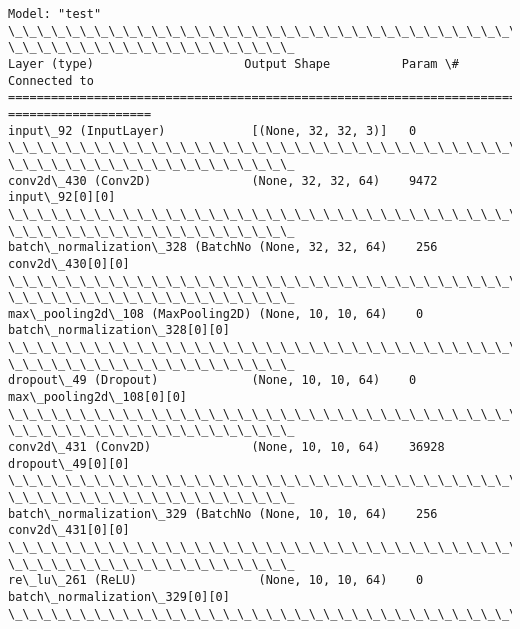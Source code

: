 \documentclass[11pt]{article}
\begin{document}
    \begin{Verbatim}[commandchars=\\\{\}]
Model: "test"
\_\_\_\_\_\_\_\_\_\_\_\_\_\_\_\_\_\_\_\_\_\_\_\_\_\_\_\_\_\_\_\_\_\_\_\_\_\_\_\_\_\_\_\_\_\_\_\_\_\_\_\_\_\_\_\_\_\_\_\_\_\_\_\_\_\_\_\_\_\_\_\_\_\_\_\_\_\_\_\_
\_\_\_\_\_\_\_\_\_\_\_\_\_\_\_\_\_\_\_\_
Layer (type)                     Output Shape          Param \#     Connected to
================================================================================
====================
input\_92 (InputLayer)            [(None, 32, 32, 3)]   0
\_\_\_\_\_\_\_\_\_\_\_\_\_\_\_\_\_\_\_\_\_\_\_\_\_\_\_\_\_\_\_\_\_\_\_\_\_\_\_\_\_\_\_\_\_\_\_\_\_\_\_\_\_\_\_\_\_\_\_\_\_\_\_\_\_\_\_\_\_\_\_\_\_\_\_\_\_\_\_\_
\_\_\_\_\_\_\_\_\_\_\_\_\_\_\_\_\_\_\_\_
conv2d\_430 (Conv2D)              (None, 32, 32, 64)    9472
input\_92[0][0]
\_\_\_\_\_\_\_\_\_\_\_\_\_\_\_\_\_\_\_\_\_\_\_\_\_\_\_\_\_\_\_\_\_\_\_\_\_\_\_\_\_\_\_\_\_\_\_\_\_\_\_\_\_\_\_\_\_\_\_\_\_\_\_\_\_\_\_\_\_\_\_\_\_\_\_\_\_\_\_\_
\_\_\_\_\_\_\_\_\_\_\_\_\_\_\_\_\_\_\_\_
batch\_normalization\_328 (BatchNo (None, 32, 32, 64)    256
conv2d\_430[0][0]
\_\_\_\_\_\_\_\_\_\_\_\_\_\_\_\_\_\_\_\_\_\_\_\_\_\_\_\_\_\_\_\_\_\_\_\_\_\_\_\_\_\_\_\_\_\_\_\_\_\_\_\_\_\_\_\_\_\_\_\_\_\_\_\_\_\_\_\_\_\_\_\_\_\_\_\_\_\_\_\_
\_\_\_\_\_\_\_\_\_\_\_\_\_\_\_\_\_\_\_\_
max\_pooling2d\_108 (MaxPooling2D) (None, 10, 10, 64)    0
batch\_normalization\_328[0][0]
\_\_\_\_\_\_\_\_\_\_\_\_\_\_\_\_\_\_\_\_\_\_\_\_\_\_\_\_\_\_\_\_\_\_\_\_\_\_\_\_\_\_\_\_\_\_\_\_\_\_\_\_\_\_\_\_\_\_\_\_\_\_\_\_\_\_\_\_\_\_\_\_\_\_\_\_\_\_\_\_
\_\_\_\_\_\_\_\_\_\_\_\_\_\_\_\_\_\_\_\_
dropout\_49 (Dropout)             (None, 10, 10, 64)    0
max\_pooling2d\_108[0][0]
\_\_\_\_\_\_\_\_\_\_\_\_\_\_\_\_\_\_\_\_\_\_\_\_\_\_\_\_\_\_\_\_\_\_\_\_\_\_\_\_\_\_\_\_\_\_\_\_\_\_\_\_\_\_\_\_\_\_\_\_\_\_\_\_\_\_\_\_\_\_\_\_\_\_\_\_\_\_\_\_
\_\_\_\_\_\_\_\_\_\_\_\_\_\_\_\_\_\_\_\_
conv2d\_431 (Conv2D)              (None, 10, 10, 64)    36928
dropout\_49[0][0]
\_\_\_\_\_\_\_\_\_\_\_\_\_\_\_\_\_\_\_\_\_\_\_\_\_\_\_\_\_\_\_\_\_\_\_\_\_\_\_\_\_\_\_\_\_\_\_\_\_\_\_\_\_\_\_\_\_\_\_\_\_\_\_\_\_\_\_\_\_\_\_\_\_\_\_\_\_\_\_\_
\_\_\_\_\_\_\_\_\_\_\_\_\_\_\_\_\_\_\_\_
batch\_normalization\_329 (BatchNo (None, 10, 10, 64)    256
conv2d\_431[0][0]
\_\_\_\_\_\_\_\_\_\_\_\_\_\_\_\_\_\_\_\_\_\_\_\_\_\_\_\_\_\_\_\_\_\_\_\_\_\_\_\_\_\_\_\_\_\_\_\_\_\_\_\_\_\_\_\_\_\_\_\_\_\_\_\_\_\_\_\_\_\_\_\_\_\_\_\_\_\_\_\_
\_\_\_\_\_\_\_\_\_\_\_\_\_\_\_\_\_\_\_\_
re\_lu\_261 (ReLU)                 (None, 10, 10, 64)    0
batch\_normalization\_329[0][0]
\_\_\_\_\_\_\_\_\_\_\_\_\_\_\_\_\_\_\_\_\_\_\_\_\_\_\_\_\_\_\_\_\_\_\_\_\_\_\_\_\_\_\_\_\_\_\_\_\_\_\_\_\_\_\_\_\_\_\_\_\_\_\_\_\_\_\_\_\_\_\_\_\_\_\_\_\_\_\_\_

\end{Verbatim}
\end{document}
